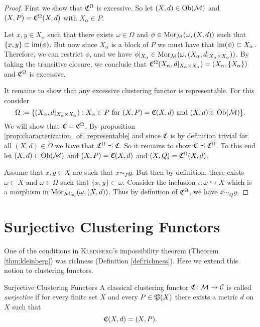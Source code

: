 \begin{proof}
First we show that $\Cf^\Omega$ is excessive. So let $(X,d) \in \ob(\M)$ and $(X,P) = \Cf^\Omega(X,d)$ with $X_\alpha \in P$.

Let $x,y \in X_\alpha$ such that there exists $\omega \in \Omega$ and $\phi \in \mor_\M(\omega, (X,d))$ such that ${\{x,y\} \subset \image(\phi)}$. But now since $X_\alpha$ is a block of $P$ we must have that $\image(\phi) \subset X_\alpha$. Therefore, we can restrict $\phi$, and we have $\phi|_{X_\alpha} \in \mor_\M(\omega, (X_\alpha, d|_{X_\alpha \times X_\alpha}))$. By taking the transitive closure, we conclude that $\Cf^\Omega(X_\alpha, d|_{X_\alpha \times X_\alpha}) = (X_\alpha, \{X_\alpha\})$ and $\Cf^\Omega$ is excessive.

It remains to show that any excessive clustering functor is representable. For this consider
$$
\Omega := \{(X_\alpha, d|_{X_\alpha \times X_\alpha}): X_\alpha \in P \text{ for } (X, P) = \Cf(X,d) \text{ and } (X,d) \in \ob(\M)\}.
$$
We will show that $\Cf = \Cf^\Omega$. By proposition \ref{prop:characterization_of_representable} and since $\Cf$ is by definition trivial for all $(X,d) \in \Omega$ we have that $\Cf^\Omega \refines \Cf$. So it remains to show $\Cf \refines \Cf^\Omega$. To this end let $(X,d) \in \ob(\M)$ and $(X,P) = \Cf(X,d)$ and $(X,Q) = \Cf^\Omega(X,d)$.

Assume that $x,y \in X$ are such that $x \sim_P y$. But then by definition, there exists $\omega \subset X$ and $\omega \in \Omega$ such that $\{x,y\} \subset \omega$. Consider the inclusion $\iota: \omega \hookrightarrow X$ which is a morphism in $\mor_\inj(\omega, (X,d))$. Thus by definition of $\Cf^\Omega$, we have $x \sim_Q y$.
\end{proof}

\section{Surjective Clustering Functors}

One of the conditions in \textsc{Kleinberg}'s impossibility theorem (Theorem \ref{thm:kleinberg}) was richness (Definition \ref{def:richness}). Here we extend this notion to clustering functors.

\begin{definition}{Surjective Clustering Functors}{}
    A classical clustering functor $\Cf\colon \M \to \C$ is called \emph{surjective} if for every finite set $X$ and every $P \in \P(X)$ there exists a metric $d$ on $X$ such that
    \begin{equation*}
        \Cf(X,d) = (X,P).
    \end{equation*}
\end{definition}


